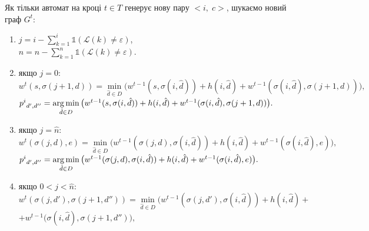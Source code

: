 Як тільки автомат на кроці $ t \in T $ генерує нову пару $<i, \;c>$, шукаємо новий граф $G^t$:
\begin{enumerate}
	\item
		$ j = i - \sum\limits_{k = 1}^{i}{ \mathds{1}(\mathcal{L}(k) \neq \varepsilon ) } $,\\
		$ \hat{n} = n - \sum\limits_{k = 1}^{n}{ \mathds{1}(\mathcal{L}(k) \neq \varepsilon ) } $.\\
	\item 
		якщо $ j = 0$:\\
		$ w^t(s, \sigma(j+1, d)) = \min\limits_{\hat{d} \in D} 
		\big( w^{t-1}(s, \sigma(i,\hat{d})) + h(i, \hat{d}) +  w^{t-1}(\sigma(i, \hat{d}), \sigma(j+1,d)) \big), $ \\
		
		$ {p^i}_{d',d''} = \operatorname*{arg\,min}\limits_{\hat{d} \in D} 
		\big( w^{t-1}(s, \sigma(i,\hat{d})) + h(i, \hat{d}) +  w^{t-1}(\sigma(i, \hat{d}), \sigma(j+1,d)) \big). $\\
	\item 
		якщо $ j = \hat{n}$:\\
		
		$ w^t(\sigma(j, d) , e ) = \min\limits_{\hat{d} \in D} 
		\big( w^{t-1}(\sigma(j, d), \sigma(i,\hat{d})) + h(i, \hat{d}) +  w^{t-1}(\sigma(i, \hat{d}), e) \big), $ \\
		
		$ {p^i}_{d',d''} = \operatorname*{arg\,min}\limits_{\hat{d} \in D} 
		\big( w^{t-1}(\sigma(j, d), \sigma(i,\hat{d})) + h(i, \hat{d}) +  w^{t-1}(\sigma(i, \hat{d}), e) \big). $  \\
	\item 
		якщо $ 0 < j < \hat{n}$:\\
		
		$ w^t(\sigma(j, d') , \sigma(j+1, d'') ) = \min\limits_{\hat{d} \in D} 
		\Big( w^{t-1}(\sigma(j, d'), \sigma(i,\hat{d})) + h(i, \hat{d}) + $\\
		$+  w^{t-1}(\sigma(i, \hat{d}), \sigma(j+1, d'') \Big), $ \\
		

\end{enumerate}
